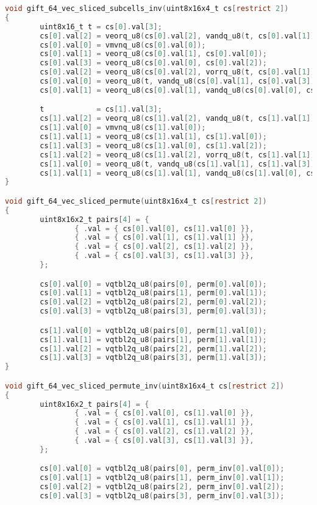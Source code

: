 \begin{lstlisting}[language=c, caption={gift\_vec\_sliced.c}]
void gift_64_vec_sliced_subcells_inv(uint8x16x4_t cs[restrict 2])
{
        uint8x16_t t = cs[0].val[3];
        cs[0].val[2] = veorq_u8(cs[0].val[2], vandq_u8(t, cs[0].val[1]));
        cs[0].val[0] = vmvnq_u8(cs[0].val[0]);
        cs[0].val[1] = veorq_u8(cs[0].val[1], cs[0].val[0]);
        cs[0].val[3] = veorq_u8(cs[0].val[0], cs[0].val[2]);
        cs[0].val[2] = veorq_u8(cs[0].val[2], vorrq_u8(t, cs[0].val[1]));
        cs[0].val[0] = veorq_u8(t, vandq_u8(cs[0].val[1], cs[0].val[3]));
        cs[0].val[1] = veorq_u8(cs[0].val[1], vandq_u8(cs[0].val[0], cs[0].val[2]));

        t            = cs[1].val[3];
        cs[1].val[2] = veorq_u8(cs[1].val[2], vandq_u8(t, cs[1].val[1]));
        cs[1].val[0] = vmvnq_u8(cs[1].val[0]);
        cs[1].val[1] = veorq_u8(cs[1].val[1], cs[1].val[0]);
        cs[1].val[3] = veorq_u8(cs[1].val[0], cs[1].val[2]);
        cs[1].val[2] = veorq_u8(cs[1].val[2], vorrq_u8(t, cs[1].val[1]));
        cs[1].val[0] = veorq_u8(t, vandq_u8(cs[1].val[1], cs[1].val[3]));
        cs[1].val[1] = veorq_u8(cs[1].val[1], vandq_u8(cs[1].val[0], cs[1].val[2]));
}

void gift_64_vec_sliced_permute(uint8x16x4_t cs[restrict 2])
{
        uint8x16x2_t pairs[4] = {
                { .val = { cs[0].val[0], cs[1].val[0] }},
                { .val = { cs[0].val[1], cs[1].val[1] }},
                { .val = { cs[0].val[2], cs[1].val[2] }},
                { .val = { cs[0].val[3], cs[1].val[3] }},
        };

        cs[0].val[0] = vqtbl2q_u8(pairs[0], perm[0].val[0]);
        cs[0].val[1] = vqtbl2q_u8(pairs[1], perm[0].val[1]);
        cs[0].val[2] = vqtbl2q_u8(pairs[2], perm[0].val[2]);
        cs[0].val[3] = vqtbl2q_u8(pairs[3], perm[0].val[3]);

        cs[1].val[0] = vqtbl2q_u8(pairs[0], perm[1].val[0]);
        cs[1].val[1] = vqtbl2q_u8(pairs[1], perm[1].val[1]);
        cs[1].val[2] = vqtbl2q_u8(pairs[2], perm[1].val[2]);
        cs[1].val[3] = vqtbl2q_u8(pairs[3], perm[1].val[3]);
}

void gift_64_vec_sliced_permute_inv(uint8x16x4_t cs[restrict 2])
{
        uint8x16x2_t pairs[4] = {
                { .val = { cs[0].val[0], cs[1].val[0] }},
                { .val = { cs[0].val[1], cs[1].val[1] }},
                { .val = { cs[0].val[2], cs[1].val[2] }},
                { .val = { cs[0].val[3], cs[1].val[3] }},
        };

        cs[0].val[0] = vqtbl2q_u8(pairs[0], perm_inv[0].val[0]);
        cs[0].val[1] = vqtbl2q_u8(pairs[1], perm_inv[0].val[1]);
        cs[0].val[2] = vqtbl2q_u8(pairs[2], perm_inv[0].val[2]);
        cs[0].val[3] = vqtbl2q_u8(pairs[3], perm_inv[0].val[3]);


\end{lstlisting}

